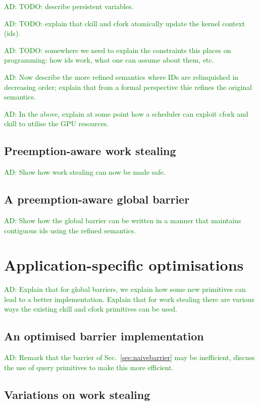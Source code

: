 \documentclass[nocopyrightspace]{sigplanconf-pldi16}
\newcommand{\ADComment}[1]{\textcolor{green}{AD: #1}}
\newcommand{\mysec}{Sec.~}
\begin{document}
\ADComment{TODO: describe persistent variables.}

\ADComment{TODO: explain that ckill and cfork atomically update the
  kernel context (ids).}

\ADComment{TODO: somewhere we need to explain the constraints this
  places on programming: how ids work, what one can assume about them,
  etc.}

\ADComment{Now describe the more refined semantics where IDs are
  relinquished in decreasing order; explain that from a formal
  perspective thie refines the original semantics.}

\ADComment{In the above, explain at some point how a scheduler can
  exploit cfork and ckill to utilise the GPU resources.}

\subsection{Preemption-aware work stealing}

\ADComment{Show how work stealing can now be made safe.}

\subsection{A preemption-aware global barrier}

\ADComment{Show how the global barrier can be written in a manner that
  maintains contiguous ids using the refined semantics.}


\section{Application-specific optimisations}

\ADComment{Explain that for global barriers, we explain how some new
  primitives can lead to a better implementation.  Explain that for
  work stealing there are various ways the existing ckill and cfork
  primitives can be used.}

\subsection{An optimised barrier implementation}

\ADComment{Remark that the barrier of \mysec\ref{sec:naivebarrier} may
  be inefficient, discuss the use of query primitives to make this
  more efficient.}

\subsection{Variations on work stealing}
\end{document}
